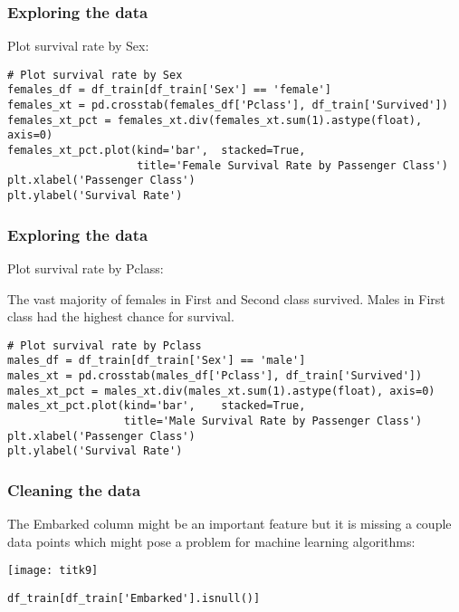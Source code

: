 \begin{frame}[fragile]\frametitle{Exploring  the data}
Plot survival rate by Sex:
\begin{lstlisting}
# Plot survival rate by Sex
females_df = df_train[df_train['Sex'] == 'female']
females_xt = pd.crosstab(females_df['Pclass'], df_train['Survived'])
females_xt_pct = females_xt.div(females_xt.sum(1).astype(float), axis=0)
females_xt_pct.plot(kind='bar',  stacked=True, 
                    title='Female Survival Rate by Passenger Class')
plt.xlabel('Passenger Class')
plt.ylabel('Survival Rate')
\end{lstlisting}

\end{frame}

\begin{frame}[fragile]\frametitle{Exploring  the data}
Plot survival rate by Pclass:

The vast majority of females in First and Second class survived. Males in First class had the highest chance for survival.

\begin{lstlisting}
# Plot survival rate by Pclass
males_df = df_train[df_train['Sex'] == 'male']
males_xt = pd.crosstab(males_df['Pclass'], df_train['Survived'])
males_xt_pct = males_xt.div(males_xt.sum(1).astype(float), axis=0)
males_xt_pct.plot(kind='bar',    stacked=True, 
                  title='Male Survival Rate by Passenger Class')
plt.xlabel('Passenger Class')
plt.ylabel('Survival Rate')                      
\end{lstlisting}

\end{frame}


\begin{frame}[fragile]\frametitle{Cleaning  the data}
The Embarked column might be an important feature but it is missing a couple data points which might pose a problem for machine learning algorithms:

\begin{center}
\texttt{[image: titk9]}
\end{center}

\begin{lstlisting}
df_train[df_train['Embarked'].isnull()]
\end{lstlisting}

\end{frame}


